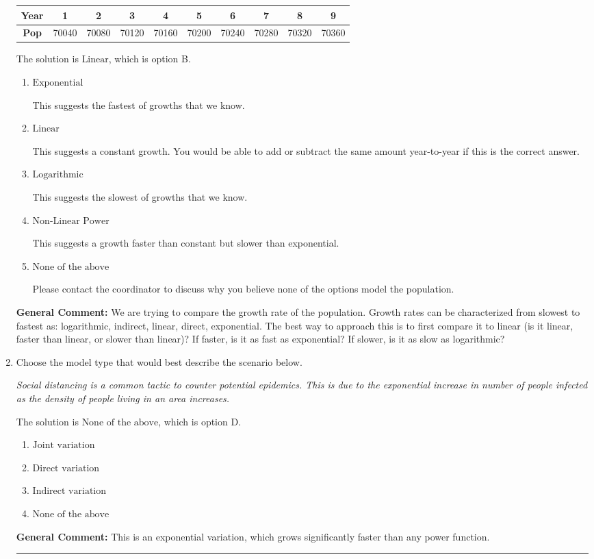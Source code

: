 \documentclass{extbook}[14pt]
\newcommand{\litem}[1]{\item #1

\rule{\textwidth}{0.4pt}}
\begin{document}
\begin{enumerate}
{\begin{tabular}{c|c|c|c|c|c|c|c|c|c}
\textbf{Year} &1 &2 &3 &4 &5 &6 &7 &8 &9\tabularnewline \hline
\textbf{Pop} &70040 &70080 &70120 &70160 &70200 &70240 &70280 &70320 &70360\end{tabular}The solution is \( \text{Linear} \), which is option B.\begin{enumerate}[label=\Alph*.]
\item \( \text{Exponential} \)

This suggests the fastest of growths that we know.
\item \( \text{Linear} \)

This suggests a constant growth. You would be able to add or subtract the same amount year-to-year if this is the correct answer.
\item \( \text{Logarithmic} \)

This suggests the slowest of growths that we know.
\item \( \text{Non-Linear Power} \)

This suggests a growth faster than constant but slower than exponential.
\item \( \text{None of the above} \)

Please contact the coordinator to discuss why you believe none of the options model the population.
\end{enumerate}

\textbf{General Comment:} We are trying to compare the growth rate of the population. Growth rates can be characterized from slowest to fastest as: logarithmic, indirect, linear, direct, exponential. The best way to approach this is to first compare it to linear (is it linear, faster than linear, or slower than linear)? If faster, is it as fast as exponential? If slower, is it as slow as logarithmic?
}
\litem{
Choose the model type that would best describe the scenario below.

\begin{center}
    \textit{ Social distancing is a common tactic to counter potential epidemics. This is due to the exponential increase in number of people infected as the density of people living in an area increases. }
\end{center}
The solution is \( \text{None of the above} \), which is option D.\begin{enumerate}[label=\Alph*.]
\item \( \text{Joint variation} \)


\item \( \text{Direct variation} \)


\item \( \text{Indirect variation} \)


\item \( \text{None of the above} \)


\end{enumerate}

\textbf{General Comment:} This is an exponential variation, which grows significantly faster than any power function.
}
\end{enumerate}
\end{document}
